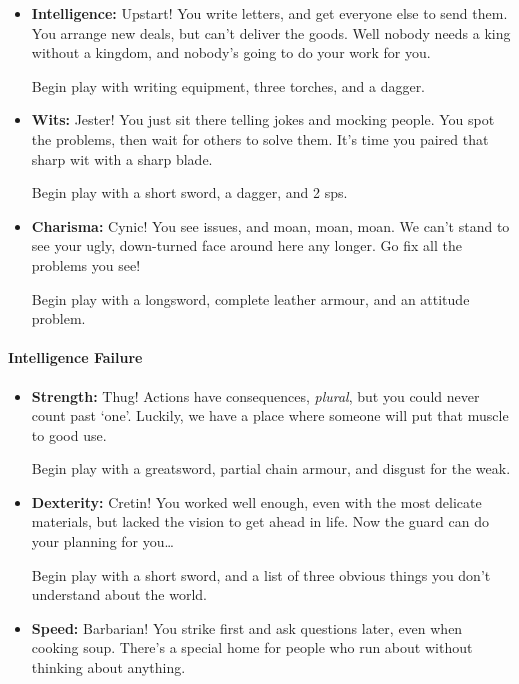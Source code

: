{\begin{multicols}{2}
\begin{itemize}
  Begin play with a javelin, partial leather armour, 80 \glspl{cp}, and nasty black eye.
  \item
  \textbf{Intelligence:}
  Upstart!
  You write letters, and get everyone else to send them.
  You arrange new deals, but can't deliver the goods.
  Well nobody needs a king without a kingdom, and nobody's going to do your work for you.

  Begin play with writing equipment, three torches, and a dagger.
  \item
  \textbf{Wits:}
  Jester!
  You just sit there telling jokes and mocking people.
  You spot the problems, then wait for others to solve them.
  It's time you paired that sharp wit with a sharp blade.

  Begin play with a short sword, a dagger, and 2 \glspl{sp}.
  \item
  \textbf{Charisma:}
  Cynic!
  You see issues, and moan, moan, moan.
  We can't stand to see your ugly, down-turned face around here any longer.
  Go fix all the problems you see!

  Begin play with a longsword, complete leather armour, and an attitude problem.

\end{itemize}

\paragraph{Intelligence Failure}

\begin{itemize}

  \item
  \textbf{Strength:}
  Thug!
  Actions have consequences, \emph{plural}, but you could never count past `one'.
  Luckily, we have a place where someone will put that muscle to good use.

  Begin play with a greatsword, partial chain armour, and disgust for the weak.
  \item
  \textbf{Dexterity:}
  Cretin!
  You worked well enough, even with the most delicate materials, but lacked the vision to get ahead in life.
  Now the \gls{guard} can do your planning for you\ldots

  Begin play with a short sword, and a list of three obvious things you don't understand about the world.

  \item
  \textbf{Speed:}
  Barbarian!
  You strike first and ask questions later, even when cooking soup.
  There's a special home for people who run about without thinking about anything.


\end{itemize}
\end{multicols}}
